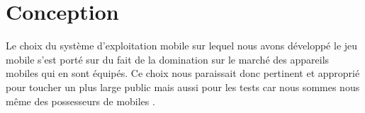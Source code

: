 \newpage
\section{Conception}
Le choix du système d'exploitation mobile sur lequel nous avons développé le jeu mobile s'est porté sur \android du fait de la domination sur le marché des appareils mobiles qui en sont équipés. Ce choix nous paraissait donc pertinent et approprié pour toucher un plus large public mais aussi pour les tests car nous sommes nous même des possesseurs de mobiles \android{}. 


